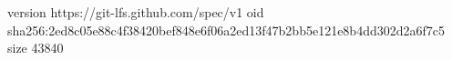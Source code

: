 version https://git-lfs.github.com/spec/v1
oid sha256:2ed8c05e88c4f38420bef848e6f06a2ed13f47b2bb5e121e8b4dd302d2a6f7c5
size 43840
